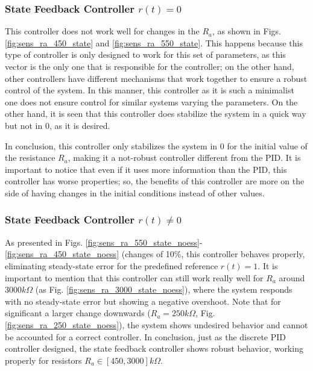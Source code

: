 \subsubsection{State Feedback Controller $r(t) = 0$}
This controller does not work well for changes in the $R_a$, as shown in Figs. \ref{fig:sens_ra_450_state} and \ref{fig:sens_ra_550_state}. This happens because this type of controller is only designed to work for this set of parameters, as this vector is the only one that is responsible for the controller; on the other hand, other controllers have different mechanisms that work together to ensure a robust control of the system. In this manner, this controller as it is such a minimalist one does not ensure control for similar systems varying the parameters. On the other hand, it is seen that this controller does stabilize the system in a quick way but not in 0, as it is desired.

In conclusion, this controller only stabilizes the system in 0 for the initial value of the resistance $R_a$, making it a not-robust controller different from the PID. It is important to notice that even if it uses more information than the PID, this controller has worse properties; so, the benefits of this controller are more on the side of having changes in the initial conditions instead of other values.


\subsubsection{State Feedback Controller $r(t) \neq 0$}
As presented in Figs. \ref{fig:sens_ra_550_state_noess}-\ref{fig:sens_ra_450_state_noess} (changes of 10\%, this controller behaves properly, eliminating steady-state error for the predefined reference $r(t)=1$. It is important to mention that this controller can still work really well for $R_a$ around $3000k\Omega$ (as Fig. \ref{fig:sens_ra_3000_state_noess}), where the system responds with no steady-state error but showing a negative overshoot. Note that for significant a larger change downwards ($R_a=250k\Omega$, Fig. \ref{fig:sens_ra_250_state_noess}), the system shows undesired behavior and cannot be accounted for a correct controller. In conclusion, just as the discrete PID controller designed, the state feedback controller shows robust behavior, working properly for resistors $R_a\in[450,3000]k\Omega$.